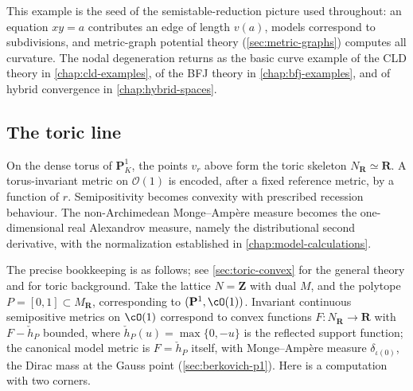 This example is the seed of the semistable-reduction picture used
throughout: an equation $xy=a$ contributes an edge of length $v(a)$, models
correspond to subdivisions, and metric-graph potential theory
(\cref{sec:metric-graphs}) computes all curvature.  The nodal degeneration
returns as the basic curve example of the CLD theory in
\cref{chap:cld-examples}, of the BFJ theory in \cref{chap:bfj-examples}, and
of hybrid convergence in \cref{chap:hybrid-spaces}.

\subsection{The toric line}
\label{sec:ch01-running-toric}

On the dense torus of $\mathbf P^1_K$, the points $v_r$ above form the toric
skeleton $N_{\mathbf R}\simeq\mathbf R$.  A torus-invariant metric on
$\mathcal O(1)$ is encoded, after a fixed reference metric, by a function of
$r$.  Semipositivity becomes convexity with prescribed recession behaviour.
The non-Archimedean Monge--Amp\`ere measure becomes the one-dimensional real
Alexandrov measure, namely the distributional second derivative, with the
normalization established in \cref{chap:model-calculations}.

The precise bookkeeping is as follows; see \cref{sec:toric-convex} for the
general theory and \cite{BGPS14,CLS11} for toric background.  Take the
lattice $N=\mathbf Z$ with dual $M$, and the polytope $P=[0,1]\subset
M_{\mathbf R}$, corresponding to $(\mathbf P^1,\cO(1))$.  Invariant
continuous semipositive metrics on $\cO(1)$ correspond to convex functions
$F:N_{\mathbf R}\to\mathbf R$ with $F-\check h_P$ bounded, where
$\check h_P(u)=\max\{0,-u\}$ is the reflected support function; the
canonical model metric is $F=\check h_P$ itself, with Monge--Amp\`ere
measure $\delta_{\iota(0)}$, the Dirac mass at the Gauss point
(\cref{sec:berkovich-p1}).  Here is a computation with two corners.

